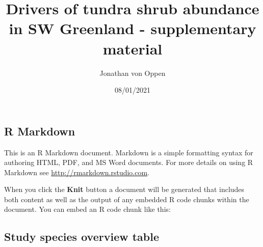 \documentclass[
]{article}
\title{Drivers of tundra shrub abundance in SW Greenland - supplementary
material}
\author{Jonathan von Oppen}
\date{08/01/2021}
\begin{document}
\maketitle

{
\setcounter{tocdepth}{2}
\tableofcontents
}
\hypertarget{r-markdown}{%
\subsection{R Markdown}\label{r-markdown}}

This is an R Markdown document. Markdown is a simple formatting syntax
for authoring HTML, PDF, and MS Word documents. For more details on
using R Markdown see \url{http://rmarkdown.rstudio.com}.

When you click the \textbf{Knit} button a document will be generated
that includes both content as well as the output of any embedded R code
chunks within the document. You can embed an R code chunk like this:

\hypertarget{study-species-overview-table}{%
\subsection{Study species overview
table}\label{study-species-overview-table}}
\end{document}
